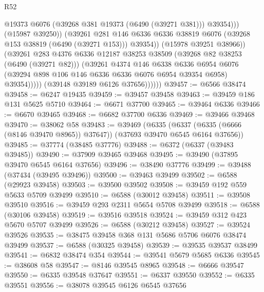 \begin{lexlean}{R52}
\begin{coremodule}
                                @19373
                                @6076
                                (@39268 @381 @19373 (@6490 (@39271 @381)))
                                @39354)))
                          (@15987 @39250))
                        (@39261
                          @281
                          @146
                          @6336
                          @6336
                          @38819
                          @6076
                          (@39268 @153 @38819 (@6490 (@39271 @153)))
                          @39354))
                      (@15978 @39251 @38966))
                    (@39261
                      @283
                      @4376
                      @6336
                      @12187
                      @38253
                      @38509
                      (@39268 @82 @38253 (@6490 (@39271 @82)))
                      (@39261
                        @4374
                        @146
                        @6338
                        @6336
                        @6954
                        @6076
                        (@39294 @898 @106 @146 @6336 @6336 @6076 @6954 @39354 @6958)
                        @39354)))))
              (@39148 @39189 @6126 @37656))))))
@39457 := @6566 @38474
@39458 := @6247 @19435
@39459 := @39457 @39458
@39463 := @39459 @186 @131 @5625 @5710
@39464 := @6671 @37700
@39465 := @39464 @6336
@39466 := @6670 @39465
@39468 := @6682 @37700 @6336
@39469 := @39466 @39468
@39470 := @38062 @58
@39483 := @39469
    (@6335 (@6337 (@6335 (@6666 (@8146 @39470 @8965)) @37647)) (@37693 @39470 @6545 @6164 @37656))
@39485 := @37774 (@38485 @37776)
@39488 := @6372 (@6337 (@39483 @39485))
@39490 := @37909 @39465 @39468
@39495 := @39490 (@37895 @39470 @6545 @6164 @37656)
@39496 := @38490 @37776
@39499 := @39488 (@37434 (@39495 @39496))
@39500 := @39463 @39499
@39502 := @6588 (@29923 @39458)
@39503 := @39500 @39502
@39508 := @39459 @192 @559 @5633 @5709 @39499
@39510 := @6588 (@30012 @39458)
@39511 := @39508 @39510
@39516 := @39459 @293 @2311 @5654 @5708 @39499
@39518 := @6588 (@30106 @39458)
@39519 := @39516 @39518
@39524 := @39459 @312 @423 @5670 @5707 @39499
@39526 := @6588 (@30212 @39458)
@39527 := @39524 @39526
@39535 := @38475 @39458 @368 @131 @5686 @5706 @6076 @38474 @39499
@39537 := @6588 (@30325 @39458)
@39539 := @39535 @39537 @38499
@39541 := @6832 @38474 @354
@39544 := @39541 @5679 @5685 @6336
@39545 := @38608 @58
@39547 := @8146 @39545 @8965
@39548 := @6666 @39547
@39550 := @6335 @39548 @37647
@39551 := @6337 @39550
@39552 := @6335 @39551
@39556 := @38078 @39545 @6126 @6545 @37656

\end{coremodule}
\end{lexlean}
